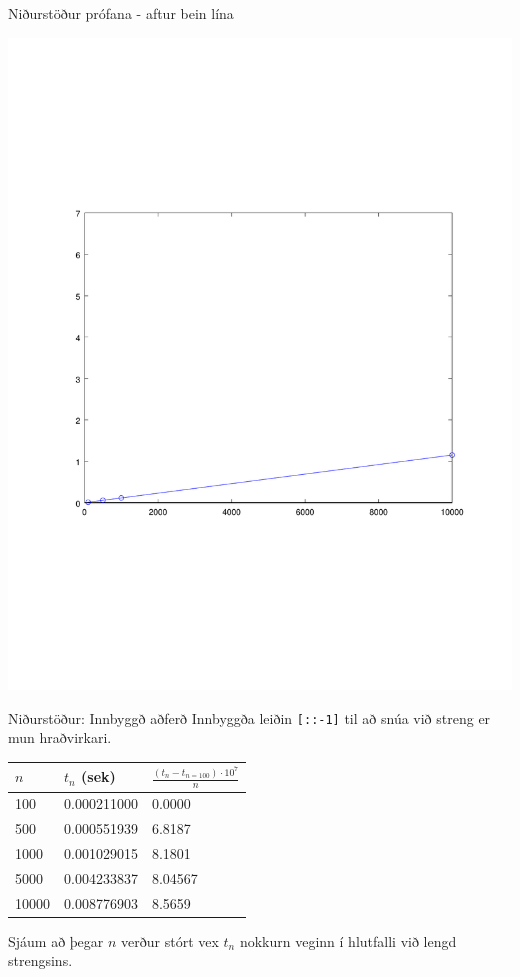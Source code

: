 \documentclass{beamer}
\begin{document}
\begin{frame}{Niðurstöður prófana - aftur bein lína}
\begin{center}
\includegraphics[height=\textheight]{Pics/lineartime2}
\end{center}
\end{frame}

\begin{frame}{Niðurstöður: Innbyggð aðferð}
Innbyggða leiðin \texttt{[::-1]} til að snúa við streng er mun hraðvirkari.

\begin{center}
\begin{tabular}{lll}
\toprule
$n$&$t_n$ (sek)&$\frac{(t_n - t_{n=100})\cdot10^7}{n}$\\
\midrule
100& 0.000211000&0.0000\\
500& 0.000551939&6.8187\\
1000& 0.001029015&8.1801\\
5000& 0.004233837&8.04567\\
10000& 0.008776903&8.5659\\
\bottomrule
\end{tabular}
\end{center}
Sjáum að þegar $n$ verður stórt vex $t_n$ nokkurn veginn í hlutfalli við lengd strengsins.
\end{frame}
\end{document}

